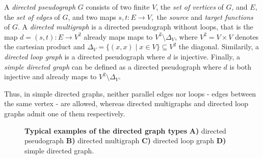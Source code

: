 \begin{definition}
    
   
  \label{def:directed_graphs}
  A \textit{directed pseudograph} $G$ consists of two finite
  $V$, the \textit{set of vertices} of $G$, and $E$, the \textit{set
    of edges} of $G$, and two maps $ s,t: E \to V, $ the
  \textit{source} and \textit{target functions} of $G$. A
  \textit{directed multigraph} is a directed pseudograph without
  loops, that is the map $d = (s,t):E \to V^2$ already maps
  maps to $V^2\setminus\Delta_V$, where $V^2 = V \times V$ denotes the
  cartesian product and $\Delta_V = \{(x,x) \mid x \in V\} \subseteq
  V^2$ the diagonal. Similarily, a \textit{directed loop graph} is a
  directed pseudograph where $d$ is injective. Finally, a
  \textit{simple directed graph} can be defined as a directed
  pseudograph where $d$ is both injective and already maps to
  $V^2\setminus\Delta_V$.
\end{definition}

Thus, in simple directed graphs, neither parallel edges nor loops -
edges between the same vertex - are allowed, whereas directed
multigraphs and directed loop graphs admit one of them respectively.


\begin{figure}[!htbp]
  \centering 
  \vfill
  \vspace{0.25cm}
    \caption{%
      \textbf{Typical examples of the directed graph types}
      \textbf{A)} directed pseudograph \textbf{B)} directed
      multigraph \textbf{C)} directed loop graph \textbf{D)} simple
      directed graph.} %
  \label{fig:directed_graph_types}
\end{figure}

